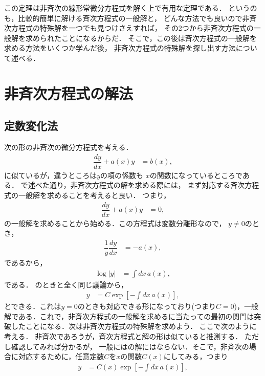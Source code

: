 この定理は非斉次の線形常微分方程式を解く上で有用な定理である．
というのも，比較的簡単に解ける斉次方程式の一般解と，
どんな方法でも良いので非斉次方程式の特殊解を一つでも見つけさえすれば，
その2つから非斉次方程式の一般解を求められたことになるからだ．
そこで，この後は斉次方程式の一般解を求める方法をいくつか学んだ後，
非斉次方程式の特殊解を探し出す方法について述べる．

%
%
\section{非斉次方程式の解法}
%
\subsection{定数変化法}
%
次の形の非斉次の微分方程式を考える．
\begin{align}
 \dfrac{dy}{dx}+a\left(x\right)y & =b\left(x\right), \label{eq:PDE_06}
\end{align}
%
に似ているが，違うところは$y$の項の係数も
$x$の関数になっているところである．
で述べた通り，非斉次方程式の解を求める際には，
まず対応する斉次方程式の一般解を求めることを考えると良い．
つまり，
\begin{align}
 \dfrac{dy}{dx}+a\left(x\right)y & = 0,
\end{align}
の一般解を求めることから始める．この方程式は変数分離形なので，
$y\neq 0$のとき，
\begin{align}
 \dfrac{1}{y}\dfrac{dy}{dx} & =-a\left(x\right),
\end{align}
であるから，
\begin{align}
 \log\left|y\right| & =\int dx\,a\left(x\right),
\end{align}
である．
のときと全く同じ議論から，
\begin{align}
 y & =C\exp\left[-\int dx\,a\left(x\right)\right], \label{eq:PDE_06_homo_sol}
\end{align}
とできる．これは$y=0$のときも対応できる形になっており(つまり$C=0$)，一般解である．これで，非斉次方程式の一般解を求めるに当たっての最初の関門は突破したことになる．次は非斉次方程式の特殊解を求めよう．
ここで次のように考える．
非斉次であろうが，斉次方程式と解の形は似ていると推測する．
ただし確認してみれば分かるが，
一般にはの解にはならない．そこで，非斉次の場合に対応するために，任意定数$C$を$x$の関数$C\left(x\right)$にしてみる，つまり
\begin{align}
 y & =C\left(x\right)\exp\left[-\int dx\,a\left(x\right)\right],
\end{align}
